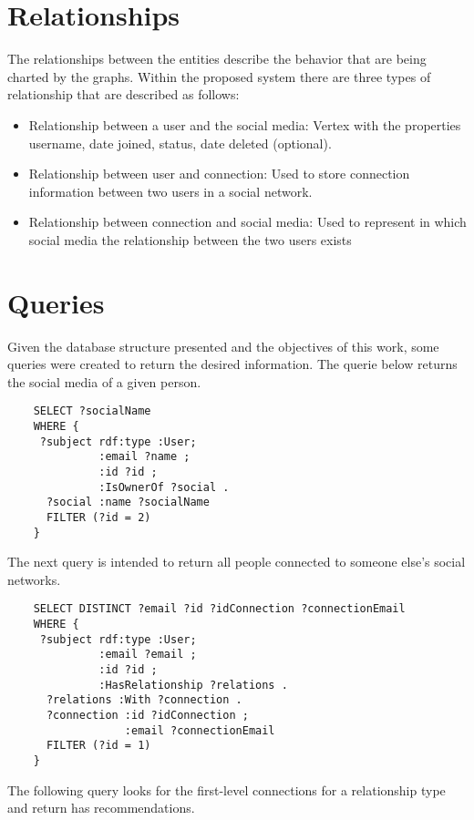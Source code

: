 \section{Relationships}

The relationships between the entities describe the behavior that are being charted by the graphs. Within the proposed system there are three types of relationship that are described as follows:

\begin{itemize}
    \item Relationship between a user and the social media: Vertex with the properties username, date joined, status, date deleted (optional).
    \item Relationship between user and connection: Used to store connection information between two users in a social network.
    \item Relationship between connection and social media: Used to represent in which social media the relationship between the two users exists
\end{itemize}


\section{Queries}

Given the database structure presented and the objectives of this work, some queries were created to return the desired information. 
The querie below returns the social media of a given person.
\begin{verbatim}
    SELECT ?socialName
    WHERE {
     ?subject rdf:type :User;
              :email ?name ;
              :id ?id ;
              :IsOwnerOf ?social .
      ?social :name ?socialName
      FILTER (?id = 2)
    }
\end{verbatim}


The next query is intended to return all people connected to someone else's social networks.

\begin{verbatim}
    SELECT DISTINCT ?email ?id ?idConnection ?connectionEmail
    WHERE {
     ?subject rdf:type :User;
              :email ?email ;
              :id ?id ;
              :HasRelationship ?relations .
      ?relations :With ?connection .
      ?connection :id ?idConnection ;
                  :email ?connectionEmail
      FILTER (?id = 1)
    }
\end{verbatim}

The following query looks for the first-level connections for a relationship type and return has recommendations.


